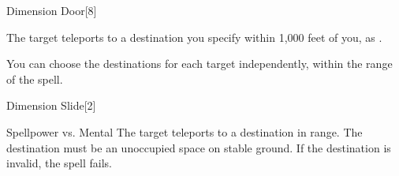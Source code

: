 \begin{spellsection}[Mass]{Dimension Door}[8]
    \begin{spellheader}
    \end{spellheader}
    \begin{spellcontent}
        \begin{spelltargetinginfo}
            \spellrng{\rngmed}
        \end{spelltargetinginfo}
        \begin{spelleffects}
            \spelleffect The target teleports to a destination you specify within 1,000 feet of you, as .
        \end{spelleffects}
    \end{spellcontent}
    \begin{spellfooter}
        \spellnotes You can choose the destinations for each target independently, within the range of the spell. 
        \miscastexplode
    \end{spellfooter}
\end{spellsection}

\begin{spellsection}{Dimension Slide}[2]
    \begin{spellheader}
    \end{spellheader}
    \begin{spellcontent}
        \begin{spelltargetinginfo}
        \end{spelltargetinginfo}
        \begin{spelleffects}
            \begin{spellattack}{Spellpower vs. Mental}
                \spelleffect The target teleports to a destination in range. The destination must be an unoccupied space on stable ground. If the destination is invalid, the spell fails.
            \end{spellattack}
        \end{spelleffects}
    \end{spellcontent}
    \begin{spellfooter}
        \miscastrandom
    \end{spellfooter}
\end{spellsection}

